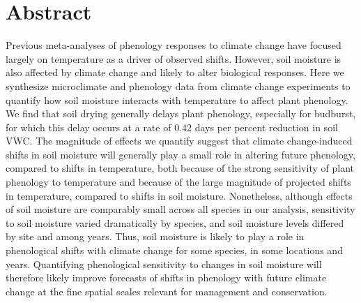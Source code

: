 \documentclass{article}
\begin{document}






\linenumbers
\section*{Abstract}
Previous meta-analyses of phenology responses to climate change have focused largely on temperature as a driver of observed shifts. However, soil moisture is also affected by climate change and likely to alter biological responses. Here we synthesize microclimate and phenology data from climate change experiments to quantify how soil moisture interacts with temperature to affect plant phenology. We find that soil drying generally delays plant phenology, especially for budburst, for which this delay occurs at a rate of 0.42 days per percent reduction in soil VWC. The magnitude of effects we quantify suggest that climate change-induced shifts in soil moisture will generally play a small role in altering future phenology, compared to shifts in temperature, both because of the strong sensitivity of plant phenology to temperature and because of the large magnitude of projected shifts in temperature, compared to shifts in soil moisture. Nonetheless, although effects of soil moisture are comparably small across all species in our analysis, sensitivity to soil moisture varied dramatically by species, and soil moisture levels differed by site and among years. Thus, soil moisture is likely to play a role in phenological shifts with climate change for some species, in some locations and years. Quantifying phenological sensitivity to changes in soil moisture will therefore likely improve forecasts of shifts in phenology with future climate change at the fine spatial scales relevant for management and conservation.  

\newpage
\end{document}
